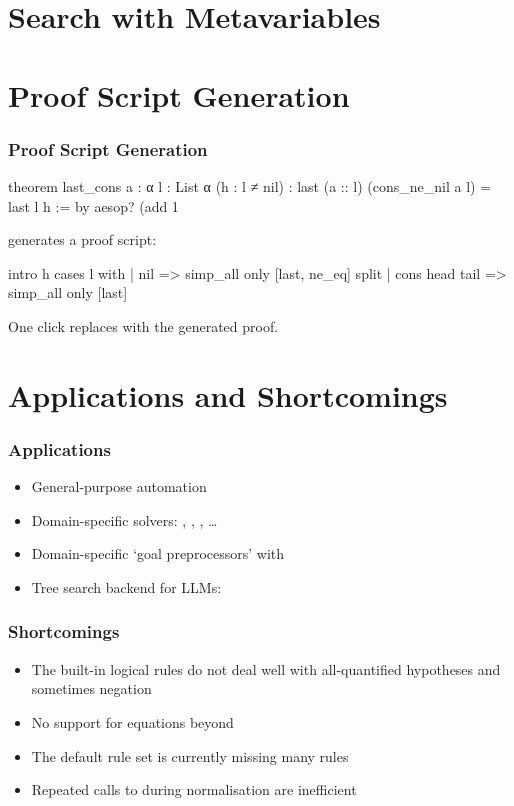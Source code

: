 \documentclass[xetex]{beamer}
\begin{document}
\section{Search with Metavariables}


\section{Proof Script Generation}

\begin{frame}[fragile]
  \frametitle{Proof Script Generation}

  \begin{leancode}
    theorem last_cons {a : α} {l : List α} (h : l ≠ nil) :
        last (a :: l) (cons_ne_nil a l) = last l h := by
      aesop? (add 1%
  \end{leancode}

  \pause

   generates a proof script:

  \begin{leancode}
    intro h
    cases l with
    | nil =>
      simp_all only [last, ne_eq]
      split
    | cons head tail => simp_all only [last]
  \end{leancode}

  One click replaces  with the generated proof.
\end{frame}

\section{Applications and Shortcomings}

\begin{frame}
  \frametitle{Applications}

  \begin{itemize}[<+->]
    \item General-purpose automation
    \item Domain-specific solvers: , , , \dots
    \item Domain-specific \enquote*{goal preprocessors} with 
    \item Tree search backend for LLMs:  %
  \end{itemize}
\end{frame}

\begin{frame}
  \frametitle{Shortcomings}

  \begin{itemize}[<+->]
    \item The built-in logical rules do not deal well with all-quantified hypotheses and sometimes negation
    \item No support for equations beyond 
    \item The default rule set is currently missing many rules
    \item Repeated calls to  during normalisation are inefficient
  \end{itemize}
\end{frame}
\end{document}
